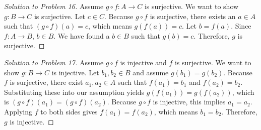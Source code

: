 \documentclass[11pt, letterpaper]{article}
\theoremstyle{definition}
\theoremstyle{remark}
\begin{document}
\begin{proof}[Solution to Problem 16]
Assume $g \circ f : A \to C$ is surjective. We want to show $g : B \to C$ is surjective. Let $c \in C$. Because $g \circ f$ is surjective, there exists an $a \in A$ such that $(g \circ f)(a) = c$, which means $g(f(a)) = c$. Let $b = f(a)$. Since $f : A \to B$, $b \in B$. We have found a $b \in B$ such that $g(b) = c$. Therefore, $g$ is surjective.
\end{proof}

\begin{proof}[Solution to Problem 17]
Assume $g \circ f$ is injective and $f$ is surjective. We want to show $g : B \to C$ is injective. Let $b_1, b_2 \in B$ and assume $g(b_1) = g(b_2)$. Because $f$ is surjective, there exist $a_1, a_2 \in A$ such that $f(a_1) = b_1$ and $f(a_2) = b_2$. Substituting these into our assumption yields $g(f(a_1)) = g(f(a_2))$, which is $(g \circ f)(a_1) = (g \circ f)(a_2)$. Because $g \circ f$ is injective, this implies $a_1 = a_2$. Applying $f$ to both sides gives $f(a_1) = f(a_2)$, which means $b_1 = b_2$. Therefore, $g$ is injective.
\end{proof}
\end{document}
